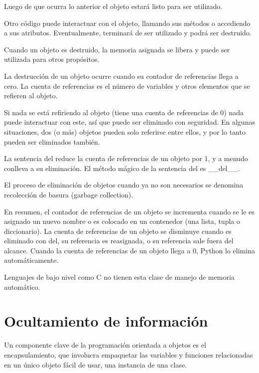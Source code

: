 \documentclass{report}
\begin{document}
Luego de que ocurra lo anterior el objeto estará listo para ser utilizado.\smallskip

Otro código puede interactuar con el objeto, llamando sus métodos o accediendo a sus atributos. Eventualmente, terminará de ser utilizado y podrá ser destruido.\smallskip

Cuando un objeto es destruido, la memoria asignada se libera y puede ser utilizada para otros propósitos.\smallskip

La destrucción de un objeto ocurre cuando su contador de referencias llega a cero. La cuenta de referencias es el número de variables y otros elementos que se refieren al objeto.\smallskip

Si nada se está refiriendo al objeto (tiene una cuenta de referencias de 0) nada puede interactuar con este, así que puede ser eliminado con seguridad.
En algunas situaciones, dos (o más) objetos pueden solo referirse entre ellos, y por lo tanto pueden ser eliminados también.\smallskip

La sentencia del reduce la cuenta de referencias de un objeto por 1, y a menudo conlleva a su eliminación. El método mágico de la sentencia del es \_\_del\_\_.\smallskip

El proceso de eliminación de objetos cuando ya no son necesarios se denomina recolección de basura (garbage collection).\smallskip

En resumen, el contador de referencias de un objeto se incrementa cuando se le es asignado un nuevo nombre o es colocado en un contenedor (una lista, tupla o diccionario). La cuenta de referencias de un objeto se disminuye cuando es eliminado con del, su referencia es reasignada, o su referencia sale fuera del alcance. Cuando la cuenta de referencias de un objeto llega a 0, Python lo elimina automáticamente.


Lenguajes de bajo nivel como C no tienen esta clase de manejo de memoria automático.

\section{Ocultamiento de información}

Un componente clave de la programación orientada a objetos es el encapsulamiento, que involucra empaquetar las variables y funciones relacionadas en un único objeto fácil de usar, una instancia de una clase.\smallskip
\end{document}
